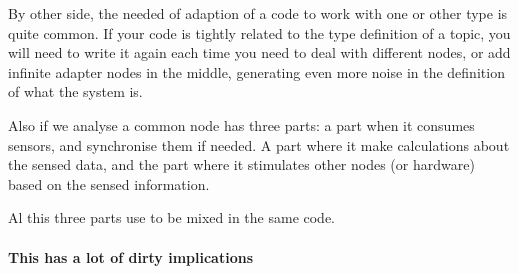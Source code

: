 \documentclass[a4paper,10pt,twoside]{book}
\begin{document}
					By other side, the needed of adaption of a code to work with one or other type is quite common. If your code is tightly related to the type definition of a topic, you will need to write it again each time you need to deal with different nodes, or add infinite adapter nodes in the middle, generating even more noise in the definition of what the system is. 
					
					Also if we analyse a common node has three parts: a part when it consumes sensors, and synchronise them if needed. A part where it make calculations about the sensed data, and the part where it stimulates other nodes (or hardware) based on the sensed information.
					
					Al this three parts use to be mixed in the same code.
					
					
					\paragraph{This has a lot of dirty implications}
					
\end{document}
